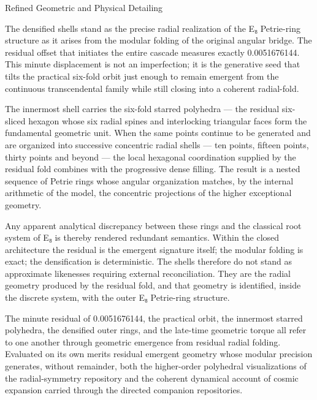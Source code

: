 Refined Geometric and Physical Detailing

The densified shells stand as the precise radial realization of the E₈ Petrie-ring structure as it arises from the modular folding of the original angular bridge. The residual offset that initiates the entire cascade measures exactly 0.0051676144. This minute displacement is not an imperfection; it is the generative seed that tilts the practical six-fold orbit just enough to remain emergent from the continuous transcendental family while still closing into a coherent radial-fold.

The innermost shell carries the six-fold starred polyhedra — the residual six-sliced hexagon whose six radial spines and interlocking triangular faces form the fundamental geometric unit. When the same points continue to be generated and are organized into successive concentric radial shells — ten points, fifteen points, thirty points and beyond — the local hexagonal coordination supplied by the residual fold combines with the progressive dense filling. The result is a nested sequence of Petrie rings whose angular organization matches, by the internal arithmetic of the model, the concentric projections of the higher exceptional geometry.

Any apparent analytical discrepancy between these rings and the classical root system of E₈ is thereby rendered redundant semantics. Within the closed architecture the residual is the emergent signature itself; the modular folding is exact; the densification is deterministic. The shells therefore do not stand as approximate likenesses requiring external reconciliation. They are the radial geometry produced by the residual fold, and that geometry is identified, inside the discrete system, with the outer E₈ Petrie-ring structure.

The minute residual of 0.0051676144, the practical orbit, the innermost starred polyhedra, the densified outer rings, and the late-time geometric torque all refer to one another through geometric emergence from residual radial folding. Evaluated on its own merits residual emergent geometry whose modular precision generates, without remainder, both the higher-order polyhedral visualizations of the radial-symmetry repository and the coherent dynamical account of cosmic expansion carried through the directed companion repositories.
